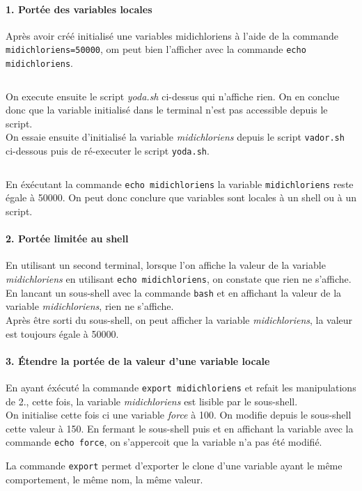 \paragraph{1. Portée des variables locales}
Après avoir créé initialisé une variables midichloriens à l'aide de la commande \texttt{midichloriens=50000}, om peut bien l'afficher avec la commande \texttt{echo midichloriens}.
\inputminted[linenos]{bash}{../sources/shell/TP1-2/ex7-yoda.sh}
On execute ensuite le script \textit{yoda.sh} ci-dessus qui n'affiche rien. On en conclue donc que la variable initialisé dans le terminal n'est pas accessible depuis le script.\\
On essaie ensuite d'initialisé la variable \textit{midichloriens} depuis le script \texttt{vador.sh} ci-dessous puis de ré-executer le script \texttt{yoda.sh}.
\inputminted[linenos]{bash}{../sources/shell/TP1-2/ex7-vador.sh}
En éxécutant la commande \texttt{echo midichloriens} la variable \texttt{midichloriens} reste égale à 50000. On peut donc conclure que variables sont locales à un shell ou à un script.

\paragraph{2. Portée limitée au shell}
En utilisant un second terminal, lorsque l’on affiche la valeur de la variable \textit{midichloriens} en utilisant \texttt{echo midichloriens}, on constate que rien ne s’affiche.\\
En lancant un sous-shell avec la commande \texttt{bash} et en affichant la valeur de la variable \textit{midichloriens}, rien ne s’affiche.\\
Après être sorti du sous-shell, on peut afficher la variable \textit{midichloriens}, la valeur est toujours égale à 50000.

\paragraph{3. Étendre la portée de la valeur d’une variable locale}
En ayant éxécuté la commande \texttt{export midichloriens} et refait les manipulations de {2.}, cette fois, la variable \textit{midichloriens} est lisible par le sous-shell.\\
On initialise cette fois ci une variable \textit{force} à 100. On modifie depuis le sous-shell cette valeur à 150. En fermant le sous-shell puis et en affichant la variable avec la commande \texttt{echo force}, on s'appercoit que la variable n'a pas été modifié. \par
La commande \texttt{export} permet d'exporter le clone d'une variable ayant le même comportement, le même nom, la même valeur.
